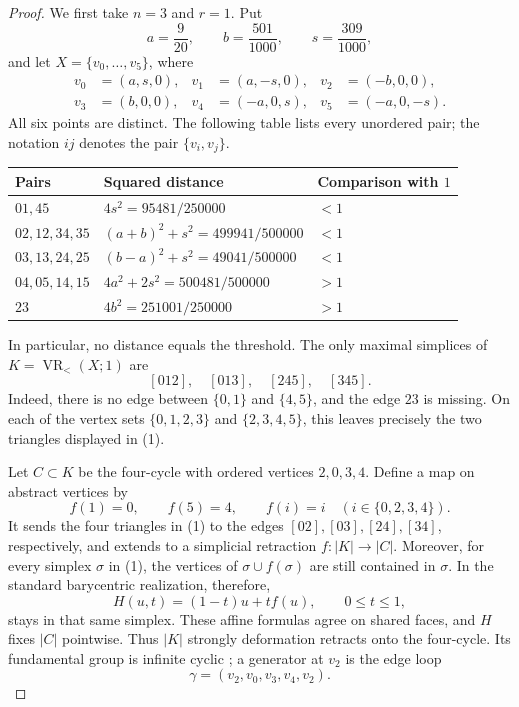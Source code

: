 \documentclass[11pt]{article}
\newcommand{\VR}{\operatorname{VR}_{<}}
\begin{document}
\begin{proof}
We first take $n=3$ and $r=1$. Put
\[
 a=\frac9{20},\qquad b=\frac{501}{1000},\qquad s=\frac{309}{1000},
\]
and let $X=\{v_0,\ldots,v_5\}$, where
\begin{align*}
 v_0&=(a,s,0),&v_1&=(a,-s,0),&v_2&=(-b,0,0),\\
 v_3&=(b,0,0),&v_4&=(-a,0,s),&v_5&=(-a,0,-s).
\end{align*}
All six points are distinct. The following table lists every unordered pair;
the notation $ij$ denotes the pair $\{v_i,v_j\}$.
\begin{center}
\begin{tabular}{lll}
\toprule
Pairs & Squared distance & Comparison with $1$\\
\midrule
$01,45$ & $4s^2=95481/250000$ & $<1$\\
$02,12,34,35$ & $(a+b)^2+s^2=499941/500000$ & $<1$\\
$03,13,24,25$ & $(b-a)^2+s^2=49041/500000$ & $<1$\\
$04,05,14,15$ & $4a^2+2s^2=500481/500000$ & $>1$\\
$23$ & $4b^2=251001/250000$ & $>1$\\
\bottomrule
\end{tabular}
\end{center}
In particular, no distance equals the threshold. The only maximal simplices
of $K=\VR(X;1)$ are
\[
 [012],\quad[013],\quad[245],\quad[345].\tag{1}
\]
Indeed, there is no edge between $\{0,1\}$ and $\{4,5\}$, and the edge $23$
is missing. On each of the vertex sets $\{0,1,2,3\}$ and $\{2,3,4,5\}$,
this leaves precisely the two triangles displayed in (1).

Let $C\subset K$ be the four-cycle with ordered vertices $2,0,3,4$.
Define a map on abstract vertices by
\[
 f(1)=0,\qquad f(5)=4,\qquad f(i)=i\quad(i\in\{0,2,3,4\}).
\]
It sends the four triangles in (1) to the edges $[02],[03],[24],[34]$,
respectively, and extends to a simplicial retraction $f:|K|\to|C|$.
Moreover, for every simplex $\sigma$ in (1), the vertices of
$\sigma\cup f(\sigma)$ are still contained in $\sigma$. In the standard
barycentric realization, therefore,
\[
 H(u,t)=(1-t)u+t f(u),\qquad 0\le t\le1,
\]
stays in that same simplex. These affine formulas agree on shared faces,
and $H$ fixes $|C|$ pointwise. Thus $|K|$ strongly deformation retracts onto
the four-cycle. Its fundamental group is infinite cyclic
\cite[Theorem~1.7 and Proposition~1.17]{Hatcher}; a generator at $v_2$ is the
edge loop
\[
 \gamma=(v_2,v_0,v_3,v_4,v_2).\tag{2}
\]


\end{proof}
\end{document}
